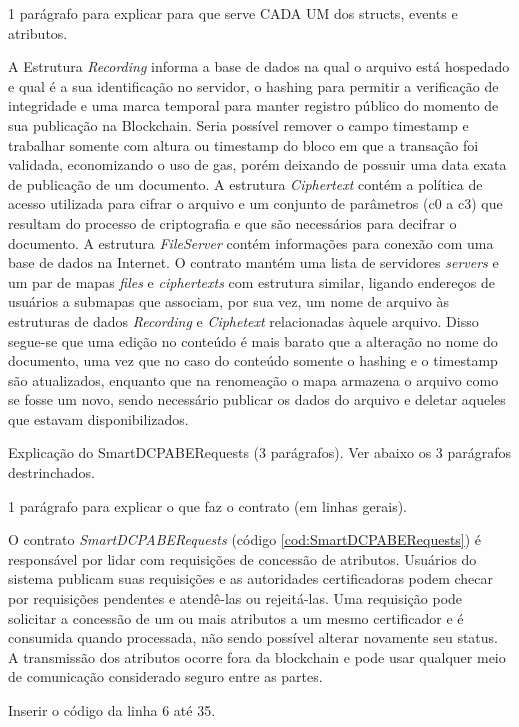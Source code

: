 \documentclass[a4paper,11pt]{article}
\begin{document}
{\color{Magenta} 1 parágrafo para explicar para que serve CADA UM dos structs, events e atributos.}

A Estrutura \emph{Recording} informa a base de dados na qual o arquivo está hospedado e qual é a sua identificação no servidor, o hashing para permitir a verificação de integridade e uma marca temporal para manter registro público do momento de sua publicação na Blockchain. Seria possível remover o campo timestamp e trabalhar somente com altura ou timestamp do bloco em que a transação foi validada, economizando o uso de gas, porém deixando de possuir uma data exata de publicação de um documento. A estrutura \emph{Ciphertext} contém a política de acesso utilizada para cifrar o arquivo e um conjunto de parâmetros (c0 a c3) que resultam do processo de criptografia e que são necessários para decifrar o documento. A estrutura \emph{FileServer} contém informações para conexão com uma base de dados na Internet. O contrato mantém uma lista de servidores \emph{servers} e um par de mapas \emph{files} e \emph{ciphertexts} com estrutura similar, ligando endereços de usuários a submapas que associam, por sua vez, um nome de arquivo às estruturas de dados \emph{Recording} e \emph{Ciphetext} relacionadas àquele arquivo. Disso segue-se que uma edição no conteúdo é mais barato que a alteração no nome do documento, uma vez que no caso do conteúdo somente o hashing e o timestamp são atualizados, enquanto que na renomeação o mapa armazena o arquivo como se fosse um novo, sendo necessário publicar os dados do arquivo e deletar aqueles que estavam disponibilizados.

{\color{ForestGreen} Explicação do  SmartDCPABERequests  (3 parágrafos). Ver abaixo os 3 parágrafos destrinchados.}

{\color{Magenta} 1 parágrafo para explicar o que faz o contrato (em linhas gerais).}

O contrato \emph{SmartDCPABERequests} (código \ref{cod:SmartDCPABERequests}) é responsável por lidar com requisições de concessão de atributos.
Usuários do sistema publicam suas requisições e as autoridades certificadoras podem checar por requisições pendentes e atendê-las ou rejeitá-las.
Uma requisição pode solicitar a concessão de um ou mais atributos a um mesmo certificador e é consumida quando processada, não sendo possível alterar novamente seu status.
A transmissão dos atributos ocorre fora da blockchain e pode usar qualquer meio de comunicação considerado seguro entre as partes.

{\color{Magenta} Inserir o código da linha 6 até 35.}
\end{document}

